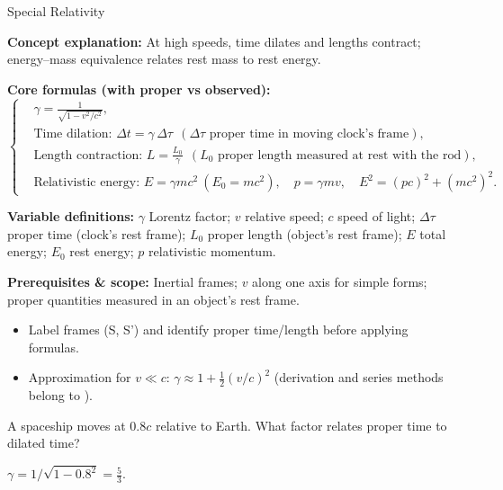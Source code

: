 \label{unit:modern}

\begin{KnowledgePoint}{Special Relativity \Core}
  \KPFormulas
  \begin{formulabox}
  \textbf{Concept explanation:} At high speeds, time dilates and lengths contract; energy–mass equivalence relates rest mass to rest energy.

  \textbf{Core formulas (with proper vs observed):}
  \[
  \left\{\begin{aligned}
  &\gamma=\frac{1}{\sqrt{1-v^2/c^2}},\\
  &\text{Time dilation: } \Delta t=\gamma\,\Delta \tau\ \ (\Delta \tau\text{ proper time in moving clock's frame}),\\
  &\text{Length contraction: } L=\frac{L_0}{\gamma}\ \ (L_0\text{ proper length measured at rest with the rod}),\\
  &\text{Relativistic energy: } E=\gamma mc^2\ (E_0=mc^2),\quad p=\gamma mv,\quad E^2=(pc)^2+(mc^2)^2.
  \end{aligned}\right.
  \]

\textbf{Variable definitions:} $\gamma$ Lorentz factor; $v$ relative speed; $c$ speed of light; $\Delta \tau$ proper time (clock's rest frame); $L_0$ proper length (object's rest frame); $E$ total energy; $E_0$ rest energy; $p$ relativistic momentum.

  \textbf{Prerequisites \& scope:} Inertial frames; $v$ along one axis for simple forms; proper quantities measured in an object's rest frame.
  \end{formulabox}

  \KPHeuristics
\begin{heuristicsbox}
  \begin{itemize}[leftmargin=*]
    \item Label frames (S, S') and identify proper time/length before applying formulas.
    \item [\Extension] Approximation for $v\ll c$: $\gamma\approx1+\tfrac12(v/c)^2$ (derivation and series methods belong to \Extension).
  \end{itemize}
  \end{heuristicsbox}

  \KPProblems
  \begin{cheatproblem}
  A spaceship moves at $0.8c$ relative to Earth. What factor relates proper time to dilated time?
  \begin{solutionbox}
  $\gamma=1/\sqrt{1-0.8^2}=\tfrac{5}{3}$.
  \end{solutionbox}
  \end{cheatproblem}
\end{KnowledgePoint}


